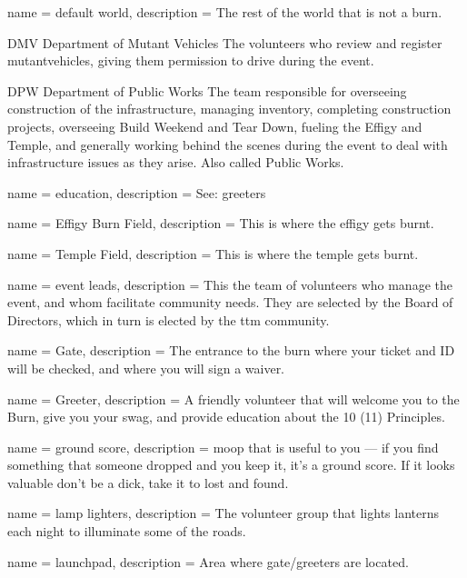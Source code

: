  {
name = {default world},
description = {The rest of the world that is not a burn.}
}

{DMV}
{Department of Mutant Vehicles}
{The volunteers who review and register \gls{mutantvehicles}, giving them permission to drive during the event.}


{DPW}
{Department of Public Works}
{The team responsible for overseeing construction of the infrastructure, managing inventory, completing construction projects, overseeing Build Weekend and Tear Down, fueling the Effigy and Temple, and generally working behind the scenes during the event to deal with infrastructure issues as they arise. Also called Public Works.}

 {
name = {education},
description = {See: \glspl{greeter}}
}

 {
name = {Effigy Burn Field},
description = {This is where the effigy gets burnt.}
}

 {
name = {Temple Field},
description = {This is where the temple gets burnt.}
}

 {
name = {event leads},
description = {This the team of volunteers who manage the event, and whom facilitate community needs. They are selected by the Board of Directors, which in turn is elected by the \gls{ttm} community.}
}

 {
name = {Gate},
description = {The entrance to the burn where your ticket and ID will be checked, and where you will sign a waiver.}
}

 {
name = {Greeter},
description = {A friendly volunteer that will welcome you to the Burn, give you your \gls{swag}, and provide \gls{education} about the 10 (11) Principles. }
}

 {
name = {ground score},
description = {\gls{moop} that is useful to you --- if you find something that someone dropped and you keep it, it's a ground score. If it looks valuable don’t be a dick, take it to lost and found. }
}

 {
name = {lamp lighters},
description = {The volunteer group that lights lanterns each night to illuminate some of the roads.}
}

 {
name = {launchpad},
description = {Area where \gls{gate}/\glspl{greeter} are located.}
}

